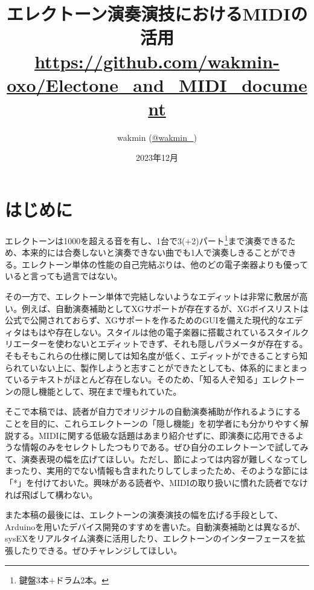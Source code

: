 \documentclass[uplatex, 10pt, dvipdfmx]{jsarticle}
\numberwithin{equation}{section}
\begin{document}
\VerbatimFootnotes
\columnseprule=0.2mm
\title{エレクトーン演奏演技におけるMIDIの活用 \\ \small\url{https://github.com/wakmin-oxo/Electone_and_MIDI_document}}
\author{wakmin (\href{https://twitter.com/wakmin_}{@wakmin\_})}
\date{2023年12月}
\maketitle


\setcounter{tocdepth}{4}
\tableofcontents
\clearpage

\section{はじめに}

エレクトーンは1000を超える音\cite{製品情報}を有し、1台で3($+$2)パート\footnote{鍵盤3本$+$ドラム2本。}まで演奏できるため、本来的には合奏しないと演奏できない曲でも1人で演奏しきることができる。エレクトーン単体の性能の自己完結ぶりは、他のどの電子楽器よりも優っていると言っても過言ではない。

その一方で、エレクトーン単体で完結しないようなエディットは非常に敷居が高い。例えば、自動演奏補助としてXGサポートが存在するが、XGボイスリストは公式で公開されておらず、XGサポートを作るためのGUIを備えた現代的なエディタはもはや存在しない。スタイルは他の電子楽器に搭載されているスタイルクリエーターを使わないとエディットできず、それも隠しパラメータが存在する。そもそもこれらの仕様に関しては知名度が低く、エディットができることすら知られていない上に、製作しようと志すことができたとしても、体系的にまとまっているテキストがほとんど存在しない。そのため、「知る人ぞ知る」エレクトーンの隠し機能として、現在まで埋もれていた。

そこで本稿では、読者が自力でオリジナルの自動演奏補助が作れるようにすることを目的に、これらエレクトーンの「隠し機能」を初学者にも分かりやすく解説する。MIDIに関する低級な話題はあまり紹介せずに、即演奏に応用できるような情報のみをセレクトしたつもりである。ぜひ自分のエレクトーンで試してみて、演奏表現の幅を広げてほしい。ただし、節によっては内容が難しくなってしまったり、実用的でない情報も含まれたりしてしまったため、そのような節には「*」を付けておいた。興味がある読者や、MIDIの取り扱いに慣れた読者でなければ飛ばして構わない。

また本稿の最後には、エレクトーンの演奏演技の幅を広げる手段として、Arduinoを用いたデバイス開発のすすめを書いた。自動演奏補助とは異なるが、sysEXをリアルタイム演奏に活用したり、エレクトーンのインターフェースを拡張したりできる。ぜひチャレンジしてほしい。
\end{document}
